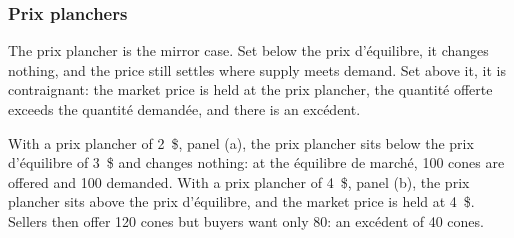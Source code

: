 \subsubsection{Prix planchers}

The prix plancher is the mirror case. Set below the prix d'équilibre, it changes
nothing, and the price still settles where supply meets demand. Set above it, it is
contraignant: the market price is held at the prix plancher, the quantité offerte
exceeds the quantité demandée, and there is an excédent.

\begin{example}
  With a prix plancher of 2~\$, panel (a), the prix plancher sits below the prix
  d'équilibre of 3~\$ and changes nothing: at the équilibre de marché, 100 cones are
  offered and 100 demanded. With a prix plancher of 4~\$, panel (b), the prix
  plancher sits
  above the prix d'équilibre, and the market price is held at 4~\$. Sellers then
  offer 120 cones but buyers want only 80: an excédent of 40 cones.
\end{example}

